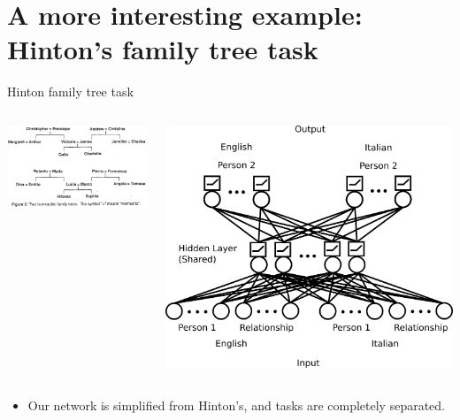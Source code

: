 \documentclass{beamer}
\begin{document}
\section{A more interesting example: Hinton's family tree task}
\begin{frame}{Hinton family tree task}
\begin{columns}
    \begin{center}
	\includegraphics[width = \textwidth]{../writing/cogsci_2017/figures/hinton_family_tree_figure.png}
    \end{center}
    \begin{center}
	\includegraphics[width = \textwidth]{../writing/cogsci_2017/figures/family_tree_network_diagram.png}
    \end{center}
\end{columns}
\begin{itemize}
\item<2-> Our network is simplified from Hinton's, and tasks are completely separated.
\end{itemize}
\end{frame}
\end{document}
